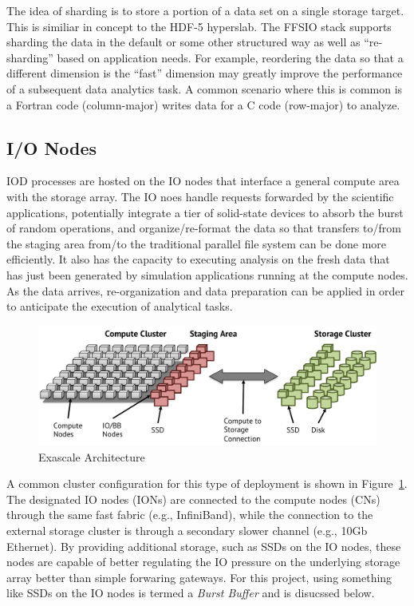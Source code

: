\documentclass[conference]{IEEEtran}
\begin{document}
The idea of sharding is to store a portion of a data set on a single storage
target. This is similiar in concept to the HDF-5 hyperslab. The FFSIO stack
supports sharding the data in the default or some other structured way as well
as ``re-sharding'' based on application needs. For example, reordering the
data so that a different dimension is the ``fast'' dimension may greatly
improve the performance of a subsequent data analytics task. A common scenario
where this is common is a Fortran code (column-major) writes data for a C code
(row-major) to analyze.

\subsection{I/O Nodes}
IOD processes are hosted on the IO nodes that interface a general compute area
with the storage array. The IO noes handle requests forwarded by the scientific
applications, potentially integrate a tier of solid-state devices to absorb the
burst of random operations, and organize/re-format the data so that transfers
to/from the staging area from/to the traditional parallel file system can be
done more efficiently. It also has the capacity to executing analysis on the
fresh data that has just been generated by simulation applications running at
the compute nodes. As the data arrives, re-organization and data preparation
can be applied in order to anticipate the execution of analytical tasks.

\begin{figure}[htbp]
\centering
\includegraphics[width=\columnwidth]{images/exa-arch.png}
\caption{Exascale Architecture}
\label{fig:exa-arch}
\end{figure}

A common cluster configuration for this type of deployment is shown in
Figure~\ref{fig:exa-arch}. The designated IO nodes (IONs) are connected to the
compute nodes (CNs) through the same fast fabric (e.g., InfiniBand), while the
connection to the external storage cluster is through a secondary slower
channel (e.g., 10Gb Ethernet). By providing additional storage, such as SSDs on
the IO nodes, these nodes are capable of better regulating the IO pressure on
the underlying storage array better than simple forwaring gateways. For this
project, using something like SSDs on the IO nodes is termed a {\em Burst
Buffer} and is disucssed below.
\end{document}
